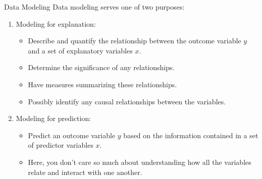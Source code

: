 \documentclass[
  ignorenonframetext,
]{beamer}
\providecommand{\tightlist}{%
  \setlength{\itemsep}{0pt}\setlength{\parskip}{0pt}}
\begin{document}
\begin{frame}{Data Modeling}
\protect\hypertarget{data-modeling}{}
Data modeling serves one of two purposes:

\begin{enumerate}
\item
  Modeling for explanation:

  \begin{itemize}
  \tightlist
  \item
    Describe and quantify the relationship between the outcome variable
    \(y\) and a set of explanatory variables \(x\).
  \item
    Determine the significance of any relationships.
  \item
    Have measures summarizing these relationships.
  \item
    Possibly identify any causal relationships between the variables.
  \end{itemize}
\item
  Modeling for prediction:

  \begin{itemize}
  \tightlist
  \item
    Predict an outcome variable \(y\) based on the information contained
    in a set of predictor variables \(x\).
  \item
    Here, you don't care so much about understanding how all the
    variables relate and interact with one another.
  \end{itemize}
\end{enumerate}
\end{frame}
\end{document}
